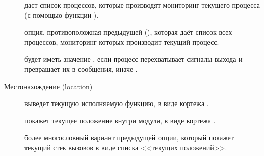 \begin{description*}
\begin{description}
		\item[] даст список процессов, которые производят мониторинг текущего процесса (с помощью функции  ).
		
		\item[] опция, противоположная предыдущей  (), которая даёт список всех процессов, мониторинг которых производит текущий процесс.
				
		\item[] будет иметь значение , если процесс перехватывает сигналы выхода и превращает их в сообщения, иначе .
	\end{description}		
		
	\item[Местонахождение (location)] \hfill
		\begin{description}
	\item[] выведет текущую исполняемую функцию, в виде кортежа .

	\item[] покажет текущее положение внутри модуля, в виде кортежа .
			
	\item[] более многословный вариант предыдущей опции, который покажет текущий стек вызовов в виде списка <<текущих положений>>.
			

\end{description}
\end{description*}
